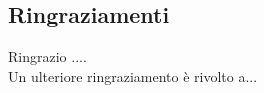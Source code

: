 \begin{otherlanguage}{italian}
\chapter*{Ringraziamenti} 
\markboth{}{}
Ringrazio  ....\\
Un ulteriore ringraziamento è rivolto a...
\end{otherlanguage}
